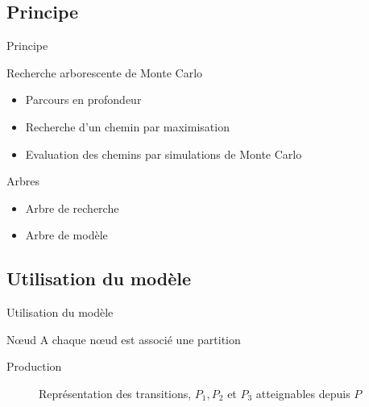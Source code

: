 \documentclass[tikz]{beamer}
\begin{document}
\subsection{Principe}
\begin{frame}[c]{Principe}
  \begin{block}{Recherche arborescente de Monte Carlo}
    \begin{itemize}
      \item Parcours en profondeur
      \item Recherche d'un chemin par maximisation
      \item Evaluation des chemins par simulations de Monte Carlo
    \end{itemize}
  \end{block}
  \begin{block}{Arbres}
    \begin{itemize}
      \item Arbre de recherche
      \item Arbre de modèle
    \end{itemize}
  \end{block}
\end{frame}

\subsection{Utilisation du modèle}
\begin{frame}[c]{Utilisation du modèle}
  \begin{block}{N\oe{}ud}
    A chaque n\oe{}ud est associé une partition
  \end{block}
  \begin{block}{Production}
    \begin{figure}
    \begin{center}
    \end{center}
    \caption{Représentation des transitions, \(P_1, P_2\) et \(P_3\)
    atteignables depuis \(P\)}
    \end{figure}

  \end{block}
\end{frame}
\end{document}
